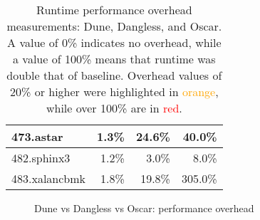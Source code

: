 \begin{table}[]
\begin{tabular}{|l|r|r|r|}
		473.astar          & 1.3\%         & {\color{orange} 24.6\%}             & {\color{orange} 40.0\%}                      \\ \hline
		482.sphinx3        & 1.2\%         & 3.0\%             & 8.0\%                      \\ \hline
		483.xalancbmk      & 1.8\%         & {\color{orange} 19.8\%}             & {\color{red} 305.0\%}                      \\ \hline
	\end{tabular}
	\caption{Runtime performance overhead measurements: Dune, Dangless, and Oscar. A value of 0\% indicates no overhead, while a value of 100\% means that runtime was double that of baseline. Overhead values of 20\% or higher were highlighted in \textcolor{orange}{orange}, while over 100\% are in \textcolor{red}{red}.}
	\label{tab:perf-dune-dangless-oscar}
\end{table}

\begin{figure}
    \centering
    \label{fig:perf-dune-dangless-oscar}
    \caption{Dune vs Dangless vs Oscar: performance overhead}
\end{figure}



